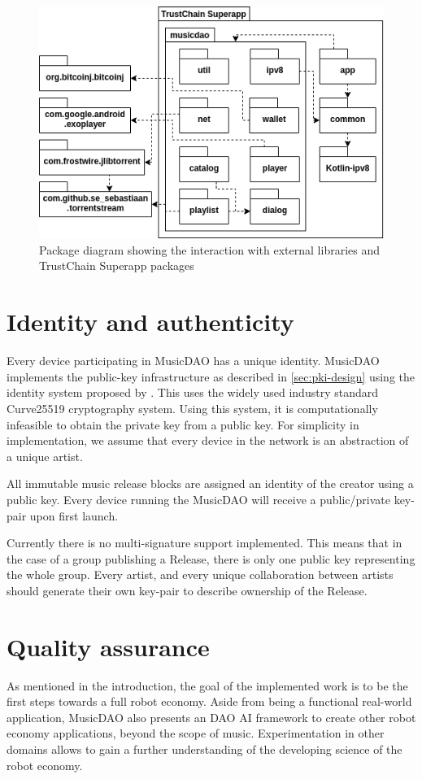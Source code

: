 \begin{figure}
    \includegraphics[width=1\linewidth]{implementation/package-diagram.png}
        \caption{Package diagram showing the interaction with external libraries and TrustChain Superapp packages}
    \label{fig:package-diagram}
    \endminipage
\end{figure}

\section{Identity and authenticity}
\label{sec:identity-authenticity}
Every device participating in MusicDAO has a unique identity. MusicDAO implements the public-key infrastructure as described in \ref{sec:pki-design} using the identity system proposed by \cite{mattskala2020}. This uses the widely used industry standard Curve25519 cryptography system. Using this system, it is computationally infeasible to obtain the private key from a  public key. For simplicity in implementation, we assume that every device in the network is an abstraction of a unique artist.

All immutable music release blocks are assigned an identity of the creator using a public key. Every device running the MusicDAO will receive a public/private key-pair upon first launch. 

Currently there is no multi-signature support implemented. This means that in the case of a group publishing a Release, there is only one public key representing the whole group. Every artist, and every unique collaboration between artists should generate their own key-pair to describe ownership of the Release.

\section{Quality assurance}
As mentioned in the introduction, the goal of the implemented work is to be the first steps towards a full robot economy. Aside from being a functional real-world application, MusicDAO also presents an DAO AI framework to create other robot economy applications, beyond the scope of music. Experimentation in other domains allows to gain a further understanding of the developing science of the robot economy. 


